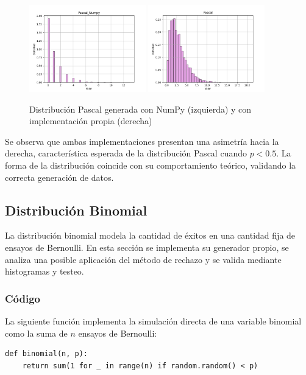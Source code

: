 \documentclass{article}
\begin{document}
\begin{figure}[H]
    \centering
    \includegraphics[width=0.45\textwidth]{Imagenes/Distribucion_Pascal_Numpy.png}
    \includegraphics[width=0.45\textwidth]{Imagenes/Distribucion_Pascal.png}
    \caption{Distribución Pascal generada con NumPy (izquierda) y con implementación propia (derecha)}
    \label{fig:pascal}
\end{figure}

Se observa que ambas implementaciones presentan una asimetría hacia la derecha, característica esperada de la distribución Pascal cuando \( p < 0.5 \). La forma de la distribución coincide con su comportamiento teórico, validando la correcta generación de datos.


\subsection{Distribución Binomial}
La distribución binomial modela la cantidad de éxitos en una cantidad fija de ensayos de Bernoulli. En esta sección se implementa su generador propio, se analiza una posible aplicación del método de rechazo y se valida mediante histogramas y testeo.

\subsubsection{Código}
La siguiente función implementa la simulación directa de una variable binomial como la suma de $n$ ensayos de Bernoulli:

\begin{verbatim}
def binomial(n, p):
    return sum(1 for _ in range(n) if random.random() < p)
\end{verbatim}
\end{document}
